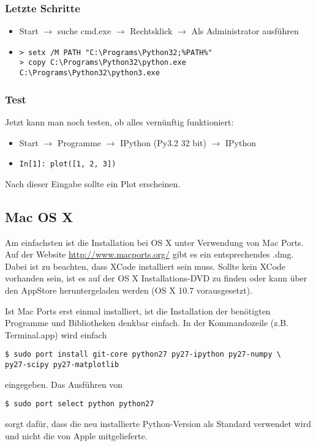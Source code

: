 \subsubsection{Letzte Schritte}
\begin{itemize}
  \item Start $\rightarrow$ suche cmd.exe $\rightarrow$ Rechtsklick $\rightarrow$ Als Administrator ausführen
  \item
\begin{verbatim}
> setx /M PATH "C:\Programs\Python32;%PATH%"
> copy C:\Programs\Python32\python.exe C:\Programs\Python32\python3.exe
\end{verbatim}
\end{itemize}

\subsubsection{Test}
Jetzt kann man noch testen, ob alles vernünftig funktioniert:
\begin{itemize}
  \item Start $\rightarrow$ Programme $\rightarrow$ IPython (Py3.2 32 bit) $\rightarrow$ IPython
  \item \texttt{In[1]: plot([1, 2, 3])}
\end{itemize}
Nach dieser Eingabe sollte ein Plot erscheinen.

\subsection{Mac OS X}
Am einfachsten ist die Installation bei OS X unter Verwendung von Mac Ports.
Auf der Website \url{http://www.macports.org/} gibt es ein entsprechendes .dmg.
Dabei ist zu beachten, dass XCode installiert sein muss. Sollte kein XCode vorhanden sein, ist es auf der OS X Installations-DVD zu finden oder kann über den AppStore heruntergeladen werden (OS X 10.7 vorausgesetzt).

Ist Mac Ports erst einmal installiert, ist die Installation der benötigten Programme und Bibliotheken denkbar einfach. In der Kommandozeile (z.B. Terminal.app) wird einfach
\begin{verbatim}
$ sudo port install git-core python27 py27-ipython py27-numpy \
py27-scipy py27-matplotlib
\end{verbatim}
eingegeben.
Das Ausführen von
\begin{verbatim}
$ sudo port select python python27
\end{verbatim}
sorgt dafür, dass die neu installierte Python-Version als Standard verwendet wird und nicht die von Apple mitgelieferte.

